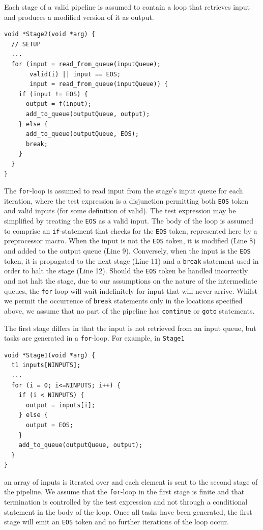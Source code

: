 %
Each stage of a valid pipeline is assumed to contain a loop that retrieves input and produces a modified version of it as output.
%
\begin{lstlisting}
void *Stage2(void *arg) {
  // SETUP
  ...
  for (input = read_from_queue(inputQueue);
       valid(i) || input == EOS;
       input = read_from_queue(inputQueue)) {
    if (input != EOS) {
      output = f(input);
      add_to_queue(outputQueue, output);
    } else {
      add_to_queue(outputQueue, EOS);
      break;
    }
  }
}
\end{lstlisting}
%
\noindent
The \lstinline|for|-loop is assumed to read input from the stage's input queue for each iteration, where the test expression is a disjunction permitting both \lstinline{EOS} token and valid inputs (for some definition of valid). The test expression may be simplified by treating the \lstinline{EOS} as a valid input.
%
The body of the loop is assumed to comprise an \lstinline|if|-statement that checks for the \lstinline{EOS}  token, represented here by a preprocessor macro. When the input is not the \lstinline{EOS}  token, it is modified (Line 8) and added to the output queue (Line 9).
%
Conversely, when the input is the \lstinline{EOS}  token, it is propagated to the next stage (Line 11) and a \lstinline|break| statement used in order to halt the stage (Line 12). Should the \lstinline{EOS}  token be handled incorrectly and not halt the stage, due to our assumptions on the nature of the intermediate queues, the \lstinline|for|-loop will wait indefinitely for input that will never arrive. Whilst we permit the occurrence of \lstinline|break| statements only in the locations specified above, we assume that no part of the pipeline has \lstinline|continue| or \lstinline|goto| statements.

The first stage differs in that the input is not retrieved from an input queue, but tasks are generated in a \lstinline|for|-loop. For example, in \lstinline|Stage1|
%
\begin{lstlisting}
void *Stage1(void *arg) {
  t1 inputs[NINPUTS];
  ...
  for (i = 0; i<=NINPUTS; i++) {
    if (i < NINPUTS) {
      output = inputs[i];
    } else {
      output = EOS;
    }
    add_to_queue(outputQueue, output);
  }
}
\end{lstlisting}
%
an array of inputs is iterated over and each element is sent to the second stage of the pipeline.
%
We assume that the \lstinline|for|-loop in the first stage is finite and that termination is controlled by the test expression and not through a conditional statement in the body of the loop.
%
Once all tasks have been generated, the first stage will emit an \lstinline{EOS}  token and no further iterations of the loop occur.



